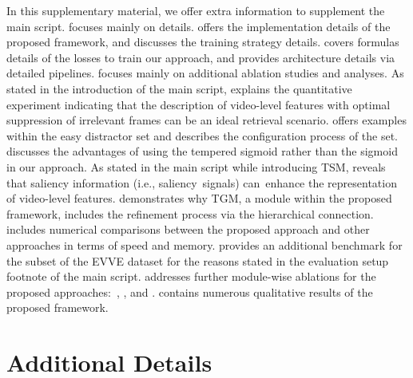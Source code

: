 \documentclass[10pt,twocolumn,letterpaper]{article}
\begin{document}
{\small


}

\clearpage

\appendix

\setcounter{figure}{0}
\setcounter{equation}{0}
\setcounter{table}{0}

\renewcommand\thefigure{\Alph{figure}}
\renewcommand\theequation{\roman{equation}}
\renewcommand\thetable{\Alph{table}}


\maketitle

In this supplementary material, we offer extra information to supplement the main script.  focuses mainly on details.  offers the implementation details of the proposed framework, and  discusses the training strategy details.  covers formulas details of the losses to train our approach, and  provides architecture details via detailed pipelines.  focuses mainly on additional ablation studies and analyses. As stated in the introduction of the main script,  explains the quantitative experiment indicating that the description of video-level features with optimal suppression of irrelevant frames can be an ideal retrieval scenario.  offers examples within the easy distractor set and describes the configuration process of the set.  discusses the advantages of using the tempered sigmoid rather than the sigmoid in our approach. As stated in the main script while introducing TSM,  reveals that saliency information (i.e., saliency signals) can enhance the representation of video-level features.  demonstrates why TGM, a module within the proposed framework, includes the refinement process via the hierarchical connection.  includes numerical comparisons between the proposed approach and other approaches in terms of speed and memory.  provides an additional benchmark for the subset of the EVVE dataset for the reasons stated in the evaluation setup footnote of the main script.  addresses further module-wise ablations for the proposed approaches:~, , and .  contains numerous qualitative results of the proposed framework.

\section{Additional Details}\label{detail}
\end{document}
